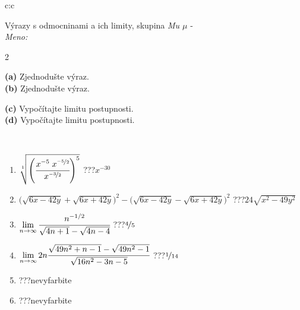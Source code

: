 \documentclass[10pt]{report}
\begin{document}
\begin{tabular}{c:c}
\begin{minipage}[c][104.5mm][t]{0.5\linewidth}
\begin{center}
\vspace{7mm}
{\huge {\Large Výrazy s odmocninami a ich limity}, skupina \textit{Mu $\mu$} -}\\[5mm]
\textit{Meno:}\phantom{xxxxxxxxxxxxxxxxxxxxxxxxxxxxxxxxxxxxxxxxxxxxxxxxxxxxxxxxxxxxxxxxx}\\[5mm]
\begin{minipage}{0.95\linewidth}
\begin{center}
{\small \begin{multicols}{2} \raggedright
\phantom{xxxxxxxxx}\textbf{(a)} Zjednodušte výraz. \\[1mm]
\phantom{xxxxxxxxx}\textbf{(b)} Zjednodušte výraz. \par \columnbreak
\textbf{(c)} Vypočítajte limitu postupnosti. \\[1mm]
\textbf{(d)} Vypočítajte limitu postupnosti.
\end{multicols}
}
\end{center}
\end{minipage}
\\[4mm]
\begin{minipage}{0.79\linewidth}
\begin{center}
\begin{varwidth}{\linewidth}
\begin{enumerate}
\small
\item $\sqrt[1]{\left(\cfrac{x^{-5}\;x^{\nicefrac{-5}{2}}}{x^{\nicefrac{-3}{2}}}\right)^{5}}$\quad \dotfill\; ???\;\dotfill \quad $x^{-30}$
\item {\footnotesize{\scriptsize$\big(\sqrt{6x-42y}+\sqrt{6x+42y}\big)^2-\big(\sqrt{6x-42y}-\sqrt{6x+42y}\big)^2$}\quad \dotfill\; ???\;\dotfill \quad $24\sqrt{x^2-49y^2}$}
\item $\lim\limits_{n\to\infty}\cfrac{n^{-1/2}}{\sqrt{4n+1}-\sqrt{4n-4}}$\quad \dotfill\; ???\;\dotfill \quad $\nicefrac{4}{5}$
\item $\lim\limits_{n\to\infty}2n\cfrac{\sqrt{49n^2+n-1}-\sqrt{49n^2-1}}{\sqrt{16n^2-3n-5}}$\quad \dotfill\; ???\;\dotfill \quad $\nicefrac{1}{14}$
\item \quad \dotfill\; ???\;\dotfill \quad nevyfarbite
\item \quad \dotfill\; ???\;\dotfill \quad nevyfarbite
\end{enumerate}
\end{varwidth}

\end{center}
\end{minipage}
\end{center}
\end{minipage}
\end{tabular}
\end{document}
